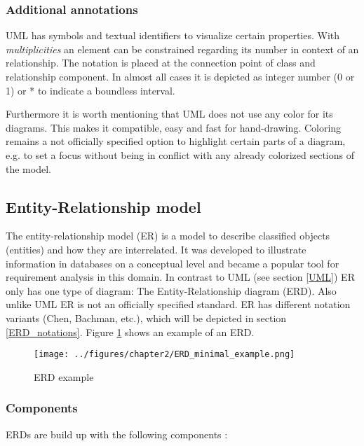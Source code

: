 \documentclass[twoside, openright, 12pt]{book}
\begin{document}
\subsubsection{Additional annotations}
\label{UML_additional_annotations}
UML has symbols and textual identifiers to visualize certain properties.
With \textit{multiplicities} an element can be constrained regarding its number in context of an relationship.
The notation is placed at the connection point of class and relationship component.
In almost all cases it is depicted as integer number (0 or 1) or * to indicate a boundless interval.

Furthermore it is worth mentioning that UML does not use any color for its diagrams.
This makes it compatible, easy and fast for hand-drawing.
Coloring remains a not officially specified option to highlight certain parts of a diagram, e.g. to set a focus without being in conflict with any already colorized sections of the model.


\subsection{Entity-Relationship model}
\label{ER}
The entity-relationship model (ER) is a model to describe classified objects (entities) and how they are interrelated.
It was developed to illustrate information in databases on a conceptual level and became a popular tool for requirement analysis in this domain.
In contrast to UML (see section \ref{UML}) ER only has one type of diagram: The Entity-Relationship diagram (ERD).
Also unlike UML ER is not an officially specified standard.
ER has different notation variants (Chen, Bachman, etc.), which will be depicted in section \ref{ERD_notations}.
Figure \ref{fig:ERD_minimal_example} shows an example of an ERD.


\begin{figure}[htb]
	\centering
	\texttt{[image: ../figures/chapter2/ERD\_minimal\_example.png]}
	\caption{ERD example}
	\label{fig:ERD_minimal_example}
\end{figure}

\subsubsection{Components}
ERDs are build up with the following components \citep{Kleuker11}:
\end{document}
